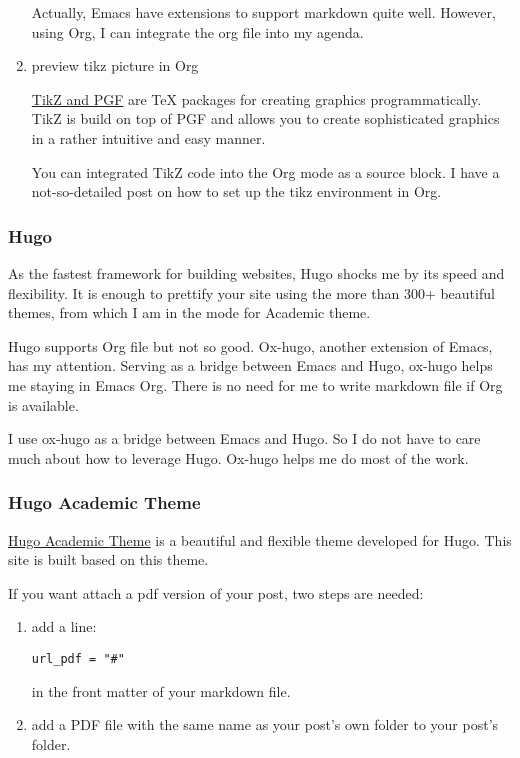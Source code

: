 \begin{enumerate}
Actually, Emacs have extensions to support markdown quite well. However, using
Org, I can integrate the org file into my agenda.


\item preview tikz picture in Org
\label{sec:org697542b}


\href{http://www.texample.net/tikz/}{TikZ and PGF} are \TeX{} packages for creating graphics programmatically. TikZ is
build on top of PGF and allows you to create sophisticated graphics in a rather
intuitive and easy manner.

You can integrated TikZ code into the Org mode as a source block. I have a
not-so-detailed post on how to set up the tikz environment in Org.
\end{enumerate}


\subsubsection{Hugo}
\label{sec:org7cb7cf9}


As the fastest framework for building websites, Hugo shocks me by its speed and
flexibility. It is enough to prettify your site using the more than 300+
beautiful themes, from which I am in the mode for Academic theme.

Hugo supports Org file but not so good. Ox-hugo, another extension of Emacs, has
my attention. Serving as a bridge between Emacs and Hugo, ox-hugo helps me
staying in Emacs Org. There is no need for me to write markdown file if Org is
available.

I use ox-hugo as a bridge between Emacs and Hugo. So I do not have to care much
about how to leverage Hugo. Ox-hugo helps me do most of the work.
\subsubsection{Hugo Academic Theme}
\label{sec:org8323bc3}


\href{https://github.com/gcushen/hugo-academic}{Hugo Academic Theme} is a beautiful and flexible theme developed for Hugo. This
site is built based on this theme.

If you want attach a pdf version of your post, two steps are needed:
\begin{enumerate}
\item add a line:
\begin{verbatim}
url_pdf = "#"
\end{verbatim}
in the front matter of your markdown file.
\item add a PDF file with the same name as your post’s own folder to your post’s
folder.
\end{enumerate}

